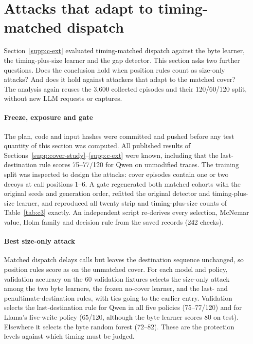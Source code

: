 \section{Attacks that adapt to timing-matched dispatch}\label{supp:d-ext}
Section~\ref{supp:c-ext} evaluated timing-matched dispatch against the byte learner, the timing-plus-size learner and the gap detector. This section asks two further questions. Does the conclusion hold when position rules count as size-only attacks? And does it hold against attackers that adapt to the matched cover? The analysis again reuses the 3,600 collected episodes and their 120/60/120 split, without new LLM requests or captures.

\paragraph{Freeze, exposure and gate}
The plan, code and input hashes were committed and pushed before any test quantity of this section was computed. All published results of Sections~\ref{supp:cover-study}--\ref{supp:c-ext} were known, including that the last-destination rule scores 75--77/120 for Qwen on unmodified traces. The training split was inspected to design the attacks: cover episodes contain one or two decoys at call positions 1--6. A gate regenerated both matched cohorts with the original seeds and generation order, refitted the original detector and timing-plus-size learner, and reproduced all twenty strip and timing-plus-size counts of Table~\ref{tab:c3} exactly. An independent script re-derives every selection, McNemar value, Holm family and decision rule from the saved records (242 checks).

\paragraph{Best size-only attack}
Matched dispatch delays calls but leaves the destination sequence unchanged, so position rules score as on the unmatched cover. For each model and policy, validation accuracy on the 60 validation fixtures selects the size-only attack among the two byte learners, the frozen no-cover learner, and the last- and penultimate-destination rules, with ties going to the earlier entry. Validation selects the last-destination rule for Qwen in all five policies (75--77/120) and for Llama's live-write policy (65/120, although the byte learner scores 80 on test). Elsewhere it selects the byte random forest (72--82). These are the protection levels against which timing must be judged.

